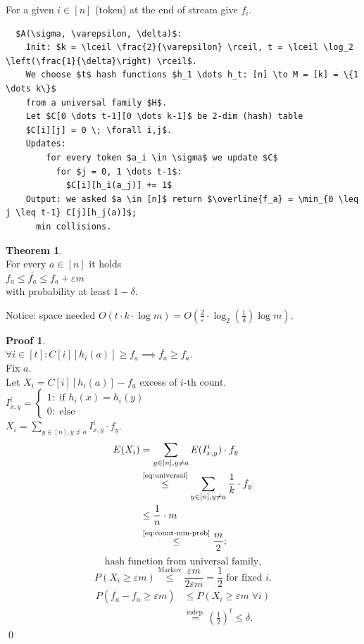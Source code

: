 \documentclass[a4paper, 12pt]{book}
\theoremstyle{definition}
\newtheorem{theorem}[counter]{Theorem}
\newtheorem{pro}[counter]{Proof}
\theoremstyle{remark}
\begin{document}
For a given $i \in [n]$ (token) at the end of stream give $f_i$.
\begin{lstlisting}
  $A(\sigma, \varepsilon, \delta)$:
    Init: $k = \lceil \frac{2}{\varepsilon} \rceil, t = \lceil \log_2 \left(\frac{1}{\delta}\right) \rceil$.
    We choose $t$ hash functions $h_1 \dots h_t: [n] \to M = [k] = \{1 \dots k\}$
    from a universal family $H$.
    Let $C[0 \dots t-1][0 \dots k-1]$ be 2-dim (hash) table
    $C[i][j] = 0 \; \forall i,j$.
    Updates:
        for every token $a_i \in \sigma$ we update $C$
          for $j = 0, 1 \dots t-1$:
            $C[i][h_i(a_j)] += 1$
    Output: we asked $a \in [n]$ return $\overline{f_a} = \min_{0 \leq j \leq t-1} C[j][h_j(a)]$;
      min collisions.
\end{lstlisting}
\begin{theorem} \text{} \\
  For every $a \in [n]$ it holds \\
  $f_a \leq \overline{f_a} \leq f_a + \varepsilon m$ \\
  with probability at least $1 - \delta$.
\end{theorem}
Notice: space needed $O(t \cdot k \cdot \log m) =
O\left(\frac{2}{\varepsilon} \cdot \log_2 \left(\frac{1}{\delta}\right) \log m\right)$.
\begin{pro} \text{} \\
  $\forall i \in [t]: C[i][h_i(a)] \geq f_a \implies \overline{f_a} \geq f_a$. \\
  Fix $a$. \\
  Let $X_i = C[i][h_i(a)] - f_a$ excess of $i$-th count. \\
  $I_{x,y}^i = \begin{cases}
    1: \text{ if } h_i(x) = h_i(y) \\
    0: \text{ else}
  \end{cases}$ \\
  $X_i = \sum_{y \in [n], y \neq a} I_{x,y}^i \cdot f_y$.
  \begin{align*}
    E(X_i) &= \sum_{y \in [n], y \neq a} E(I_{x,y}^i) \cdot f_y \\
    &\stackrel{\refeq{eq:universal}}{\leq} \sum_{y \in [n], y \neq a} \frac{1}{k} \cdot f_y \\
    &\leq \frac{1}{n} \cdot m \\
    &\stackrel{\refeq{eq:count-min-prob}}{\leq} \frac{m}{2};
  \end{align*}
  \begin{equation}
    \label{eq:universal}
    \text{hash function from universal family,}
  \end{equation}
  \begin{equation}
    \label{eq:count-min-prob}
    P(X_i \geq \varepsilon m) \stackrel{\text{Markov}}{\leq} \frac{\varepsilon m}{2 \varepsilon m} = \frac{1}{2}
    \text{ for fixed } i.
  \end{equation}
  \begin{align*}
    P(\overline{f_a} - f_a \geq \varepsilon m) &\leq P(X_i \geq \varepsilon m \; \forall i) \\
    &\stackrel{\text{indep.}}{=} \left(\frac{1}{2}\right)^t \leq \delta.
  \end{align*}
  \qed
\end{pro}
\end{document}
